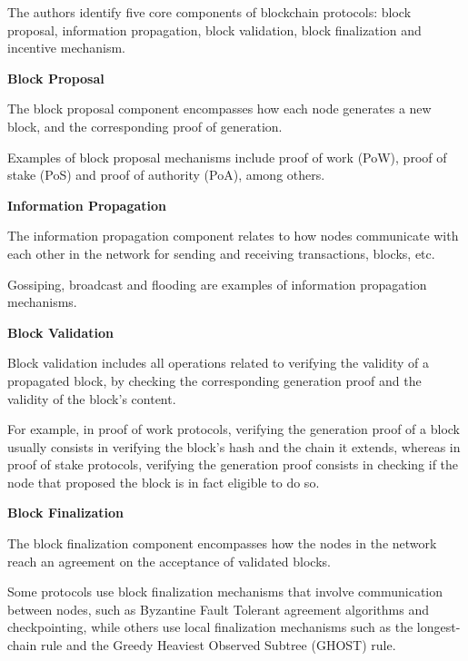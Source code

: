 The authors identify five core components of blockchain protocols: block proposal, information propagation, block validation, block finalization and incentive mechanism.

\vspace{0.5cm}

\textbf{Block Proposal}

The block proposal component encompasses how each node generates a new block, and the corresponding proof of generation.

Examples of block proposal mechanisms include proof of work (PoW), proof of stake (PoS) and proof of authority (PoA), among others.

\vspace{0.25cm}


\textbf{Information Propagation}

The information propagation component relates to how nodes communicate with each other in the network for sending and receiving transactions, blocks, etc.

Gossiping, broadcast and flooding are examples of information propagation mechanisms.

\vspace{0.25cm}

\textbf{Block Validation}

Block validation includes all operations related to verifying the validity of a propagated block, by checking the corresponding generation proof and the validity of the block’s content.

For example, in proof of work protocols, verifying the generation proof of a block usually consists in verifying the block’s hash and the chain it extends, whereas in proof of stake protocols, verifying the generation proof consists in checking if the node that proposed the block is in fact eligible to do so.

\vspace{0.25cm}

\textbf{Block Finalization}

The block finalization component encompasses how the nodes in the network reach an agreement on the acceptance of validated blocks.

Some protocols use block finalization mechanisms that involve communication between nodes, such as Byzantine Fault Tolerant agreement algorithms and checkpointing, while others use local finalization mechanisms such as the longest-chain rule and the Greedy Heaviest Observed Subtree (GHOST) rule.


